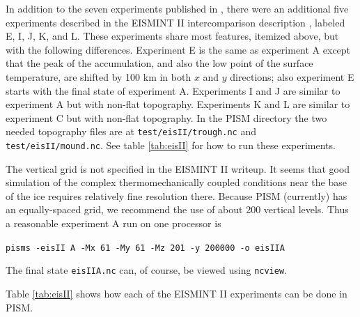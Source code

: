 \documentclass[11pt,final]{amsart}
\begin{document}
In addition to the seven experiments published in \cite{EISMINT00}, there were an additional five experiments described in the EISMINT II intercomparison description 
\cite{EISIIdescribe}, labeled E, I, J, K, and L.  These experiments share most features, itemized above, but with the following differences.  Experiment E is the same as experiment A except that the peak of the accumulation, and also the low point of the surface temperature, are shifted by 100 km in both $x$ and $y$ directions; also experiment E starts with the final state of experiment A.  Experiments I and J are similar to experiment A but with non-flat topography.  Experiments K and L are similar to experiment C but with non-flat topography.  In the PISM directory the two needed topography files are at \verb|test/eisII/trough.nc| and \verb|test/eisII/mound.nc|.  See table \ref{tab:eisII} for how to run these experiments.

The vertical grid is not specified in the EISMINT II writeup.  It seems that good simulation of the complex thermomechanically coupled conditions near the base of the ice requires relatively fine resolution there.  Because PISM (currently) has an equally-spaced grid, we recommend the use of about 200 vertical levels.  Thus a reasonable experiment A run on one processor is

\verb|pisms -eisII A -Mx 61 -My 61 -Mz 201 -y 200000 -o eisIIA|

\noindent The final state \verb|eisIIA.nc| can, of course, be viewed using \verb|ncview|.

Table \ref{tab:eisII} shows how each of the EISMINT II experiments can be done in PISM.
\end{document}

